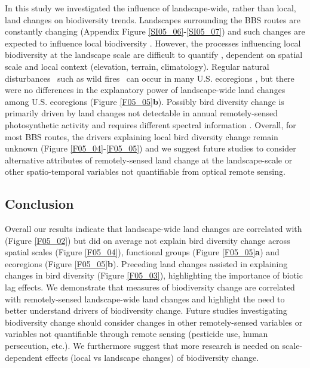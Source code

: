 In this study we investigated the influence of landscape-wide, rather than local, land changes on biodiversity trends. Landscapes surrounding the BBS routes are constantly changing (Appendix Figure \ref{SI05_06}-\ref{SI05_07}) and such changes are expected to influence local biodiversity \citep{Manning2009,Turner2015,Seppelt2016}. However, the processes influencing local biodiversity at the landscape scale are difficult to quantify \citep{Chase2003}, dependent on spatial scale \citep{Miguet2015} and local context (elevation, terrain, climatology). Regular natural disturbances \textendash\ such as wild fires \textendash\ can occur in many U.S. ecoregions \citep{Morgan2001}, but there were no differences in the explanatory power of landscape-wide land changes among U.S. ecoregions (Figure \ref{F05_05}\textbf{b}). Possibly bird diversity change is primarily driven by land changes not detectable in annual remotely-sensed photosynthetic activity and requires different spectral information \citep{Zhu2014}. Overall, for most BBS routes, the drivers explaining local bird diversity change remain unknown (Figure \ref{F05_04}-\ref{F05_05}) and we suggest future studies to consider alternative attributes of remotely-sensed land change at the landscape-scale \citep{Watson2014} or other spatio-temporal variables not quantifiable from optical remote sensing.

\subsection{Conclusion}
\label{C05_0404}

Overall our results indicate that landscape-wide land changes are correlated with (Figure \ref{F05_02}) but did on average not explain bird diversity change across spatial scales (Figure \ref{F05_04}), functional groups (Figure \ref{F05_05}\textbf{a}) and ecoregions (Figure \ref{F05_05}\textbf{b}). Preceding land changes assisted in explaining changes in bird diversity (Figure \ref{F05_03}), highlighting the importance of biotic lag effects. We demonstrate that measures of biodiversity change are correlated with remotely-sensed landscape-wide land changes and highlight the need to better understand drivers of biodiversity change. Future studies investigating biodiversity change should consider changes in other remotely-sensed variables or variables not quantifiable through remote sensing (\eg pesticide use, human persecution, etc.). We furthermore suggest that more research is needed on scale-dependent effects (local vs landscape changes) of biodiversity change. 

\clearpage
%

%  
